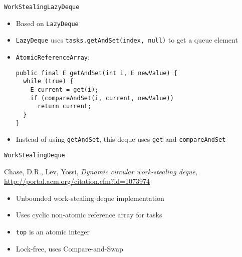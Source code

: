 \begin{frame}[fragile]{\lstinline!WorkStealingLazyDeque!}
  \begin{itemize}
  \item Based on \lstinline!LazyDeque!
  \item \lstinline!LazyDeque! uses
    \lstinline!tasks.getAndSet(index, null)! to get a queue element
  \item \lstinline!AtomicReferenceArray!:
\begin{lstlisting}[basicstyle=\fontsize{9}{11}\selectfont\ttfamily]
public final E getAndSet(int i, E newValue) {
  while (true) {
    E current = get(i);
    if (compareAndSet(i, current, newValue))
      return current;
  }
}
\end{lstlisting}
  \item Instead of using \lstinline!getAndSet!, this deque uses
    \lstinline!get! and \lstinline!compareAndSet!
  \end{itemize}
\end{frame}

\begin{frame}{\lstinline!WorkStealingDeque!}
  \begin{thebibliography}{10}
    \beamertemplatearticlebibitems
    
    Chase, D.R., Lev, Yossi, {\em Dynamic circular work-stealing deque},
    \url{http://portal.acm.org/citation.cfm?id=1073974}
  \end{thebibliography}


  \begin{itemize}
  \item Unbounded work-stealing deque implementation
  \item Uses cyclic non-atomic reference array for tasks
  \item \lstinline!top! is an atomic integer
  \item Lock-free, uses Compare-and-Swap
  \end{itemize}
\end{frame}


